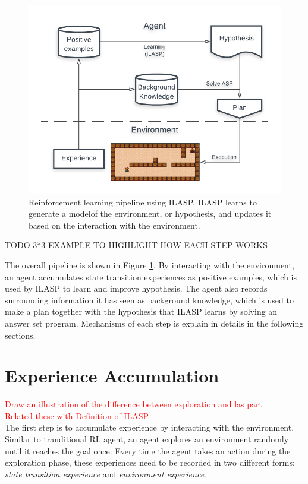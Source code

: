 \begin{figure}[!htb]
\centering
\includegraphics[width=1.0\textwidth]{./figures/architecture}
\caption{Reinforcement learning pipeline using ILASP. ILASP learns to generate a modelof the environment, or hypothesis, and updates it based on the interaction with the environment. }
\label{fig:pipeline}
\end{figure}
    
TODO 3*3 EXAMPLE TO HIGHLIGHT HOW EACH STEP WORKS

The overall pipeline is shown in Figure \ref{fig:pipeline}. By interacting with the environment, an agent accumulates state transition experiences as positive examples, which is used by ILASP to learn and improve hypothesis.
The agent also records surrounding information it has seen as background knowledge, which is used to make a plan together with the hypothesis that ILASP learns by solving an answer set program. 
Mechanisms of each step is explain in details in the following sections. 

\section{Experience Accumulation}
\label{experience_accumulation}
\textcolor{red}{Draw an illustration of the difference between exploration and las part}\\
\textcolor{red}{Related these with Definition of ILASP}\\
The first step is to accumulate experience by interacting with the environment. Similar to tranditional RL agent, an agent explores an environment randomly until it reaches the goal once. 
Every time the agent takes an action during the exploration phase, these experiences need to be recorded in two different forms: \textit{state transition experience} and \textit{environment experience}.

